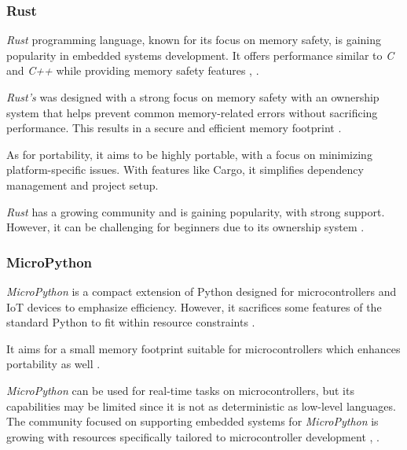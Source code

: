 \subsubsection{Rust}
\textit{Rust} programming language, known for its focus on memory safety, is gaining popularity in embedded systems development.
It offers performance similar to \textit{C} and \textit{C++} while providing memory safety features \cite{LPROG2},\cite{LPROG7} .

\textit{Rust's} was designed with a strong focus on memory safety with an ownership system that helps prevent common memory-related errors without sacrificing performance.
This results in a secure and efficient memory footprint \cite{LPROG2}.

As for portability, it aims to be highly portable, with a focus on minimizing platform-specific issues.
With features like Cargo, it simplifies dependency management and project setup.

\textit{Rust} has a growing community and is gaining popularity, with strong support.
However, it can be challenging for beginners due to its ownership system \cite{LPROG7}.

\subsubsection{MicroPython}
\textit{MicroPython} is a compact extension of Python designed for microcontrollers and IoT devices to emphasize efficiency.
However, it sacrifices some features of the standard Python to fit within resource constraints \cite{LPROG2}.

It aims for a small memory footprint suitable for microcontrollers which enhances portability as well \cite{LPROG7}.

\textit{MicroPython} can be used for real-time tasks on microcontrollers, but its capabilities may be limited since it is not as deterministic as low-level languages.
The community focused on supporting embedded systems for \textit{MicroPython} is growing with resources specifically tailored to microcontroller development \cite{LPROG2}, \cite{LPROG5}.

